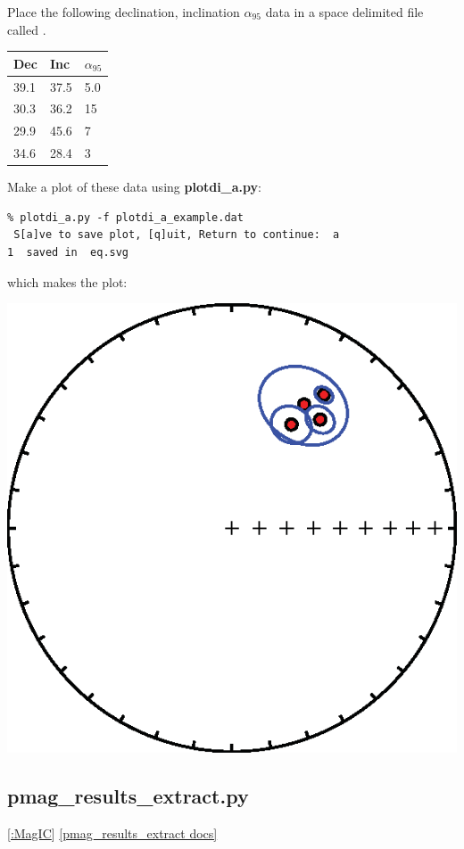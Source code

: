 \documentclass[11pt]{book}
\begin{document}
{{{Place the following declination, inclination $\alpha_{95}$ data in a space delimited file called . 

\begin{tabular}{lll}
\hline
Dec\qquad &Inc\qquad &$\alpha_{95}$\\
\hline
39.1 \qquad & 37.5 \qquad & 5.0\\
30.3 \qquad & 36.2 \qquad & 15\\
29.9 \qquad & 45.6 \qquad & 7\\
34.6 \qquad & 28.4 \qquad & 3\\
\hline
\end{tabular}

Make a plot of these data using {\bf plotdi\_a.py}:

\begin{verbatim}
% plotdi_a.py -f plotdi_a_example.dat
 S[a]ve to save plot, [q]uit, Return to continue:  a
1  saved in  eq.svg
\end{verbatim}
\noindent  which makes the plot:


  \includegraphics[width=12 cm]{EPSfiles/plotdi-a-example.eps}
   
\subsection{pmag\_results\_extract.py} 
\href{#MagiC}{[:MagIC}]
\href{http://earthref.org/PmagPy/pmagpydocs/pmag_results_extract-module.html}{[pmag\_results\_extract docs]}

}}}
\end{document}
